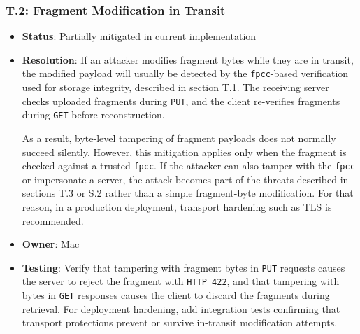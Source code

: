 \documentclass[../veristore_security_model.tex]{subfiles}
\begin{document}
\subsubsection{T.2: Fragment Modification in Transit}
\begin{itemize}
    \item \textbf{Status}: Partially mitigated in current implementation
    \item \textbf{Resolution}: If an attacker modifies fragment bytes while they are in transit, the modified payload will usually be detected by the \texttt{fpcc}-based verification used for storage integrity, described in section T.1. The receiving server checks uploaded fragments during \texttt{PUT}, and the client re-verifies fragments during \texttt{GET} before reconstruction.
    
    As a result, byte-level tampering of fragment payloads does not normally succeed silently. However, this mitigation applies only when the fragment is checked against a trusted \texttt{fpcc}. If the attacker can also tamper with the \texttt{fpcc} or impersonate a server, the attack becomes part of the threats described in sections T.3 or S.2 rather than a simple fragment-byte modification. For that reason, in a production deployment, transport hardening such as TLS is recommended.
    \item \textbf{Owner}: Mac
    \item \textbf{Testing}: Verify that tampering with fragment bytes in \texttt{PUT} requests causes the server to reject the fragment with \texttt{HTTP 422}, and that tampering with bytes in \texttt{GET} responses causes the client to discard the fragments during retrieval. For deployment hardening, add integration tests confirming that transport protections prevent or survive in-transit modification attempts.
\end{itemize}
\end{document}
